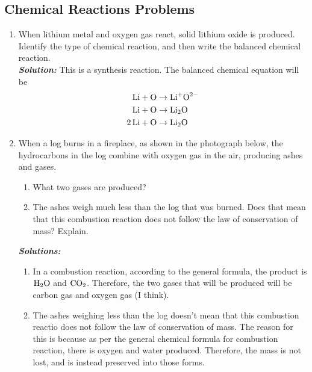 \documentclass[12pt]{report}
\begin{document}
\subsection{Chemical Reactions Problems}
\begin{enumerate}
\setlength\itemsep{1em}
    \item{When lithium metal and oxygen gas react, solid lithium oxide is produced. Identify the type of chemical reaction, and then write the balanced chemical reaction.}\\

        \textit{\textbf{Solution:}} This is a synthesis reaction. The balanced chemical equation will be 
        \begin{align*}
            \ce{Li}+ \ce{O}&\to \text{Li}^{+} \text{O}^{2-}\\
            \ce{Li}+ \ce{O}&\to \ce{Li2O}\\
            \ce{2Li}+ \ce{O}&\to \ce{Li2O}
        \end{align*}

    \item{When a log burns in a fireplace, as shown in the photograph below, the hydrocarbons in the log combine with oxygen gas in the air, producing ashes and gases.
            \begin{enumerate}[label=(\alph*)]
                \item{What two gases are produced?}
                \item{The ashes weigh much less than the log that was burned. Does that mean that this combustion reaction does not follow the law of conservation of mass? Explain.}
            \end{enumerate}
        }

        \textit{\textbf{Solutions:}} 
        \begin{enumerate}[label=(\alph*)]
            \item{In a combustion reaction, according to the general formula, the product is $ \ce{H2O}$ and $ \ce{CO2}$. Therefore, the two gases that will be produced will be carbon gas and oxygen gas (I think).}
            \item{The ashes weighing less than the log doesn't mean that this combustion reactio does not follow the law of conservation of mass. The reason for this is because as per the general chemical formula for combustion reaction, there is oxygen and water produced. Therefore, the mass is not lost, and is instead preserved into those forms.}
        \end{enumerate}


\end{enumerate}
\end{document}
